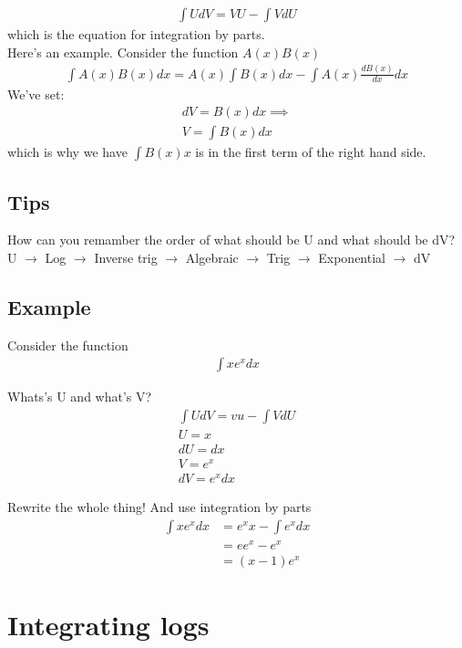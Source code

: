 \documentclass{article}
\begin{document}
\begin{align}
    \int U dV = V U - \int V dU
\end{align}
which is the equation for integration by parts. \\

Here's an example. Consider the function $A(x)B(x)$ 
\begin{align}
    \int A(x) B(x)dx = A(x) \int B(x) dx - \int A(x) \frac{d B(x)}{dx} dx
\end{align}
We've set: 
\begin{align}
    dV = B(x)dx \implies\\
    V = \int B(x) dx
\end{align}
which is why we have $\int B(x) x$ is in the first term of the right hand side.

\subsection{Tips}
How can you remamber the order of what should be U and what should be dV? \\
U $\rightarrow$ Log $\rightarrow$ Inverse trig $\rightarrow$ Algebraic $\rightarrow$ Trig $\rightarrow$ Exponential $\rightarrow$ dV \\


\subsection{Example}
Consider the function 
\begin{align}
    \int x  e^x dx
\end{align}

Whats's U and what's V? 
\begin{align}
    \int U dV = vu - \int V dU\\
    U = x\\
    dU = dx \\
    V = e^x\\
    dV = e^x dx
\end{align}

Rewrite the whole thing! And use integration by parts
\begin{align}
    \int x e^x dx &= e^x x - \int e^x dx \\
    &= e e^x - e^x \\
    &= (x - 1) e^x
\end{align}


\section{Integrating logs}
\end{document}
